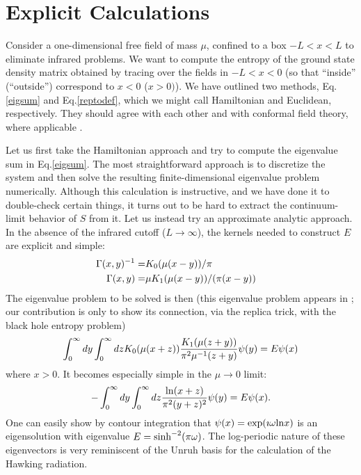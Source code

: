 \documentclass[12pt]{article}
\begin{document}
\section{Explicit Calculations}

Consider a one-dimensional free field of mass $\mu$,
confined to a box $-L<x<L$ to eliminate infrared problems.
We want to compute the entropy of the ground
state density matrix obtained by tracing over the fields in $-L<x<0$
(so that ``inside'' (``outside'') correspond to $x<0$ ($x>0)$).
We have outlined two methods, Eq.\ref{eigsum} and Eq.\ref{reptodef}, which
we might call Hamiltonian and Euclidean, respectively. They should agree with
each other and with conformal field theory, where applicable \cite{Holzhey}.

Let us first take the Hamiltonian approach and try to compute the eigenvalue
sum in Eq.\ref{eigsum}. The most straightforward approach is to discretize
the system and then solve the resulting finite-dimensional eigenvalue problem
numerically. Although this calculation is instructive, and we have done it
to double-check certain things, it turns out to be hard to extract the
continuum-limit behavior of $S$ from it. Let us instead try an approximate
analytic approach. In the absence of the infrared cutoff ($L\to\infty$),
the kernels needed to construct $E$ are explicit and simple:
\begin{eqnarray}
\Gamma(x,y)^{-1} =&K_0(\mu(x-y))/\pi\cr
\Gamma(x,y) =&\mu K_1(\mu(x-y))/(\pi (x-y))
\end{eqnarray}
The eigenvalue problem to be solved is then (this eigenvalue problem appears
in \cite{Bombelli}; our contribution is only to show its connection, via the
replica trick, with the black hole entropy problem)
\begin{equation}
\int_0^\infty dy\int_0^\infty dz
	K_0(\mu(x+z)) {K_1(\mu(z+y))\over\pi^2\mu^{-1}(z+y)} \psi(y) = E\psi(x)
\end{equation}
where $x>0$. It becomes especially simple in the $\mu\to 0$ limit:
\begin{equation}
-\int_0^\infty dy\int_0^\infty dz{{\rm \ln}(x+z)\over \pi^2(y+z)^2}
                \psi(y) = E \psi(x).
\end{equation}
One can easily show by contour integration that
$\psi(x) = \exp(\imath\omega {\rm \ln} x)$ is an eigensolution with eigenvalue
$E ={\rm sinh}^{-2}(\pi\omega)$. The log-periodic nature of these
eigenvectors is very reminiscent of the Unruh basis for the calculation of
the Hawking radiation.
\end{document}
